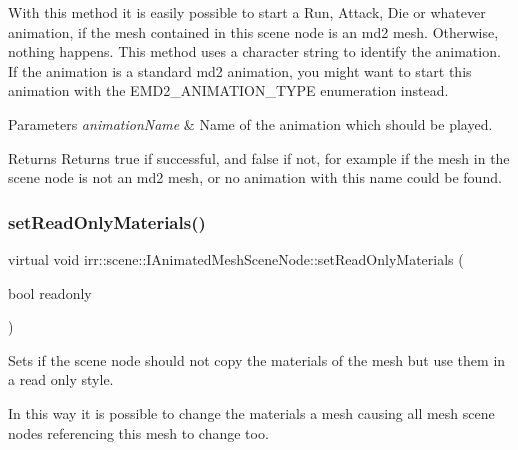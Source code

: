 With this method it is easily possible to start a Run, Attack, Die or whatever animation, if the mesh contained in this scene node is an md2 mesh. Otherwise, nothing happens. This method uses a character string to identify the animation. If the animation is a standard md2 animation, you might want to start this animation with the E\+M\+D2\+\_\+\+A\+N\+I\+M\+A\+T\+I\+O\+N\+\_\+\+T\+Y\+PE enumeration instead. 
\begin{DoxyParams}{Parameters}
{\em animation\+Name} & Name of the animation which should be played. \\
\hline
\end{DoxyParams}
\begin{DoxyReturn}{Returns}
Returns true if successful, and false if not, for example if the mesh in the scene node is not an md2 mesh, or no animation with this name could be found. 
\end{DoxyReturn}
\mbox{\label{classirr_1_1scene_1_1IAnimatedMeshSceneNode_af04e917ab3cae5631b06edad2d8a3a04}} 
\subsubsection{\texorpdfstring{set\+Read\+Only\+Materials()}{setReadOnlyMaterials()}\hspace{0.1cm}{\footnotesize\ttfamily [1/2]}}
{\footnotesize\ttfamily virtual void irr\+::scene\+::\+I\+Animated\+Mesh\+Scene\+Node\+::set\+Read\+Only\+Materials (\begin{DoxyParamCaption}\item[{bool}]{readonly }\end{DoxyParamCaption})\hspace{0.3cm}{\ttfamily [pure virtual]}}



Sets if the scene node should not copy the materials of the mesh but use them in a read only style. 

In this way it is possible to change the materials a mesh causing all mesh scene nodes referencing this mesh to change too. \mbox{\label{classirr_1_1scene_1_1IAnimatedMeshSceneNode_af04e917ab3cae5631b06edad2d8a3a04}} 
